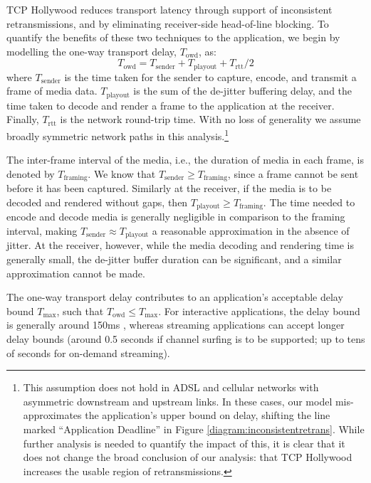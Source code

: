 

TCP Hollywood reduces transport latency through support of inconsistent
retransmissions, and by eliminating receiver-side head-of-line blocking. To
quantify the benefits of these two techniques to the application, we begin by
modelling the one-way transport delay, $T_\mathrm{owd}$, as:
\begin{equation}
  T_\mathrm{owd} = T_\mathrm{sender} + T_\mathrm{playout} + T_\mathrm{rtt}/2
  \label{eq:owd}
\end{equation}
where $T_\mathrm{sender}$ is the time taken for the sender to capture,
encode, and transmit a frame of media data. $T_\mathrm{playout}$ is the sum of
the de-jitter buffering delay, and the time taken to decode and render a frame
to the application at the receiver. Finally, $T_\mathrm{rtt}$ is the network
round-trip time. With no loss of generality we assume broadly symmetric network
paths in this analysis.\footnote{This assumption does not hold in ADSL and
cellular networks with asymmetric downstream and upstream links.  In these
cases, our model mis-approximates the application's upper bound on delay,
shifting the line marked ``Application Deadline'' in Figure
\ref{diagram:inconsistentretrans}. While further analysis is needed to
quantify the impact of this, it is clear that it does not change the broad
conclusion of our analysis: that TCP Hollywood increases the usable region of
retransmissions.}

The inter-frame interval of the media, i.e., the duration of media in each frame,
is denoted by $T_\mathrm{framing}$. We know that $T_\mathrm{sender} \geq
T_\mathrm{framing}$, since a frame cannot be sent before it has been captured.
Similarly at the receiver, if the media is to be decoded and rendered without
gaps, then $T_\mathrm{playout} \geq T_\mathrm{framing}$. The time needed to
encode and decode media %
is generally negligible in comparison to the framing interval, making
$T_\mathrm{sender} \approx T_\mathrm{playout}$ a reasonable approximation in the
absence of jitter. At the receiver, however, while the media decoding and
rendering time is generally small, the de-jitter buffer duration can be
significant, and a similar approximation cannot be made.

The one-way transport delay contributes to an application's acceptable delay
bound
$T_\mathrm{max}$, such that $T_\mathrm{owd} \leq T_\mathrm{max}$. For
interactive applications, the delay bound is generally around 150ms
\cite{itu:2003:delay}, whereas streaming applications can accept longer delay
bounds (around 0.5 seconds if channel surfing is to be supported; up to tens of
seconds for on-demand streaming).

